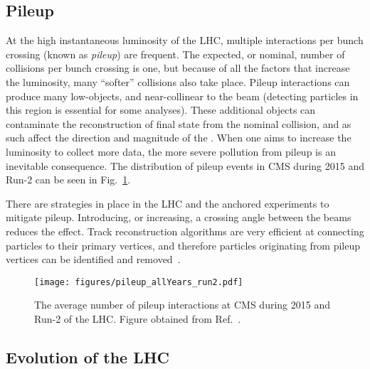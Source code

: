 \subsection{Pileup}
\label{subsec:pileup}

At the high instantaneous luminosity of the LHC, multiple interactions per bunch crossing (known as \emph{\gls{pileup}}) are frequent. The expected, or nominal, number of collisions per bunch crossing is one, but because of all the factors that increase the luminosity, many ``softer'' collisions also take place. Pileup interactions can produce many low-\pt objects, and near-collinear to the beam (detecting particles in this region is essential for some analyses). These additional objects can contaminate the reconstruction of final state from the nominal collision, and as such affect the direction and magnitude of the \ptmiss. When one aims to increase the luminosity to collect more data, the more severe pollution from pileup is an inevitable consequence. The distribution of pileup events in CMS during 2015 and Run-2 can be seen in Fig.~\ref{fig:detector_cms_pileup}.

There are strategies in place in the LHC and the anchored experiments to mitigate pileup. Introducing, or increasing, a crossing angle between the beams reduces the effect. Track reconstruction algorithms are very efficient at connecting particles to their primary vertices, and therefore particles originating from pileup vertices can be identified and removed~\cite{Chatrchyan:2014fea,Aaboud:2017all}.


\begin{figure}[htbp]
    \centering
    \texttt{[image: figures/pileup\_allYears\_run2.pdf]}
    \caption[The average number of pileup interactions at CMS during 2015 and Run-2 of the LHC]{The average number of pileup interactions at CMS during 2015 and Run-2 of the LHC. Figure obtained from Ref.~.}
    \label{fig:detector_cms_pileup}
\end{figure}




\subsection{Evolution of the LHC}
\label{subsec:evolution_lhc}

